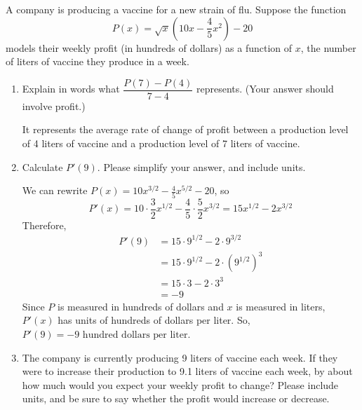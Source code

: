 \documentclass{article}
\renewcommand{\answer}[1]{#1}
\theoremstyle{theorem}
\begin{document}
\begin{enumerate}
  A company is producing a vaccine for a new strain of flu. Suppose the function
  \begin{equation*}
    P(x) 
    = \sqrt{x}\left(10x- \frac{4}{5} x^2 \right) - 20
  \end{equation*}
  models their weekly profit (in hundreds of dollars) as a function of $x$, the number of liters of vaccine they produce in a week.
  \begin{enumerate}
  \item
    \begin{problem}[\stretch{0.5}]
      Explain in words what $\dfrac{P(7) - P(4)}{7 - 4}$ represents. (Your answer should involve profit.)
    \end{problem}

    \begin{solution}
      It represents \answer{the average rate of change of profit between a production level of 4 liters of vaccine and a production level of 7 liters of vaccine}.
    \end{solution}

  \item
    \begin{problem}[\stretch{2}]
      Calculate $P'(9)$. Please simplify your answer, and include units.
    \end{problem}

    \begin{solution}
      We can rewrite $P(x) = 10 x^{3/2} -\frac{4}{5} x^{5/2} -20$, so
      \begin{equation*}
        P'(x) 
        = 10\cdot \frac{3}{2} x^{1/2} -\frac{4}{5} \cdot \frac{5}{2} x^{3/2} 
        = 15 x^{1/2} -2 x^{3/2}
      \end{equation*}
      Therefore,
      \begin{align*}
        P'(9) &= 15 \cdot 9^{1/2} - 2 \cdot 9^{3/2} \\
        &= 15 \cdot 9^{1/2} - 2 \cdot \left( 9^{1/2} \right)^3 \\
        &= 15 \cdot 3 - 2 \cdot 3^3 \\
        &= -9 
      \end{align*}
      Since $P$ is measured in hundreds of dollars and $x$ is measured in liters, $P'(x)$ has units of hundreds of dollars per liter. So, $P'(9) = \boxed{-9 \text{ hundred dollars per liter}}$.
    \end{solution}

  \item
    \begin{problem}[\vfill\newpage]
      The company is currently producing 9 liters of vaccine each week. If they were to increase their production to 9.1 liters of vaccine each week, by about how much would you expect your weekly profit to change? Please include units, and be sure to say whether the profit would increase or decrease. 
    \end{problem}


\end{enumerate}
\end{enumerate}
\end{document}
